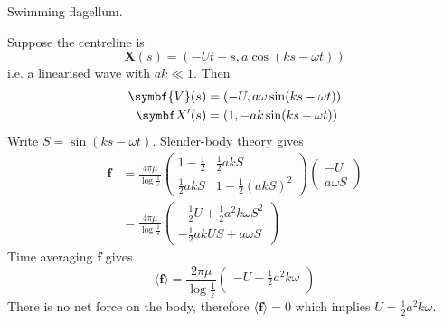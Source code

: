 \documentclass{jknotes}
\begin{document}
\begin{eg}
	Swimming flagellum. 
	
	\begin{center}
	\end{center}
			
	Suppose the centreline is
	\begin{equation}
		\symbf{X}(s) = (-Ut+s, a\cos(ks-\omega t))
	\end{equation}
	i.e. a linearised wave with $a k \ll 1$. Then
	\begin{align}
		\symbf{V}(s) &= (-U, a\omega\sin(ks-\omega t)) \\
		\X'(s) &= (1, -ak\sin(ks-\omega t))
	\end{align}
	Write $S = \sin(ks-\omega t)$. Slender-body theory gives
	\begin{align}
		\symbf{f} &= \frac{4\pi\mu}{\log \frac{1}{\varepsilon}} \begin{pmatrix} 1-
			\frac{1}{2} & \frac{1}{2}akS \\ \frac{1}{2} akS & 1-
		\frac{1}{2}(akS)^2 \end{pmatrix} \begin{pmatrix} -U \\ a\omega S
		\end{pmatrix} \\
		&= \frac{4\pi \mu}{\log \frac{1}{\varepsilon}}\begin{pmatrix}
		-\frac{1}{2}U + \frac{1}{2}a^2k\omega S^2 \\ -\frac{1}{2}akUS + a\omega S
	\end{pmatrix}
	\end{align}
	Time averaging $\symbf{f}$ gives
	\begin{equation}
		\langle \symbf{f}\rangle = \frac{2\pi\mu}{\log \frac{1}{\varepsilon}}
	\begin{pmatrix} -U + \frac{1}{2}a^2k\omega \\ \end{pmatrix}
	\end{equation}
	There is no net force on the body, therefore $\langle \symbf{f}\rangle = 0$
	which implies $U = \frac{1}{2}a^2k\omega$.
\end{eg}

\end{document}
